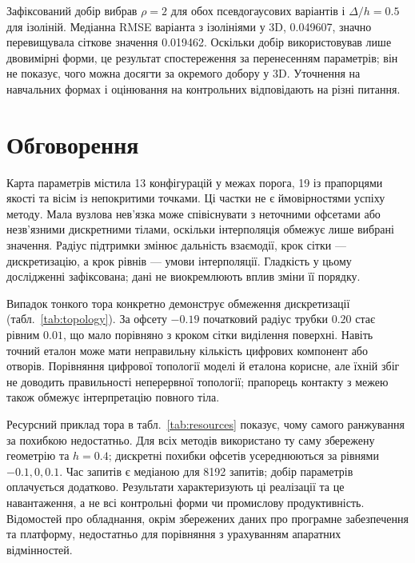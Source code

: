 \documentclass[12pt]{article}
\begin{document}
Зафіксований добір вибрав $\rho=2$ для обох псевдогаусових варіантів і $\Delta/h=0.5$ для ізоліній. Медіанна RMSE варіанта з ізолініями у 3D, 0.049607, значно перевищувала сіткове значення 0.019462. Оскільки добір використовував лише двовимірні форми, це результат спостереження за перенесенням параметрів; він не показує, чого можна досягти за окремого добору у 3D. Уточнення на навчальних формах і оцінювання на контрольних відповідають на різні питання.

\section{Обговорення}
Карта параметрів містила 13 конфігурацій у межах порога, 19 із прапорцями якості та вісім із непокритими точками. Ці частки не є ймовірностями успіху методу. Мала вузлова нев'язка може співіснувати з неточними офсетами або незв'язними дискретними тілами, оскільки інтерполяція обмежує лише вибрані значення. Радіус підтримки змінює дальність взаємодії, крок сітки — дискретизацію, а крок рівнів — умови інтерполяції. Гладкість у цьому дослідженні зафіксована; дані не виокремлюють вплив зміни її порядку.

Випадок тонкого тора конкретно демонструє обмеження дискретизації (табл.~\ref{tab:topology}). За офсету $-0.19$ початковий радіус трубки $0.20$ стає рівним $0.01$, що мало порівняно з кроком сітки виділення поверхні. Навіть точний еталон може мати неправильну кількість цифрових компонент або отворів. Порівняння цифрової топології моделі й еталона корисне, але їхній збіг не доводить правильності неперервної топології; прапорець контакту з межею також обмежує інтерпретацію повного тіла.
\begin{table}[htbp]\centering\small\caption{Тонкий тор, офсет $-0.19$, seed 42, фіксований $h=0.4$; PG: $n=4$, $\rho=2$, для ізоліній $\Delta/h=0.5$. Роздільність змінюється за незмінних полів.}\label{tab:topology}\end{table}

Ресурсний приклад тора в табл.~\ref{tab:resources} показує, чому самого ранжування за похибкою недостатньо. Для всіх методів використано ту саму збережену геометрію та $h=0.4$; дискретні похибки офсетів усереднюються за рівнями $-0.1,0,0.1$. Час запитів є медіаною для 8192 запитів; добір параметрів оплачується додатково. Результати характеризують ці реалізації та це навантаження, а не всі контрольні форми чи промислову продуктивність. Відомостей про обладнання, окрім збережених даних про програмне забезпечення та платформу, недостатньо для порівняння з урахуванням апаратних відмінностей.
\begin{table}[htbp]\centering\resizebox{\linewidth}{!}{}\caption{Збережені ресурсні випадки для тора: $h=0.4$, кут $47^\circ$, зсув $0.01$, сітка виділення поверхні $31^3$; параметри з табл.~\ref{tab:selection}.}\label{tab:resources}\end{table}
\end{document}
